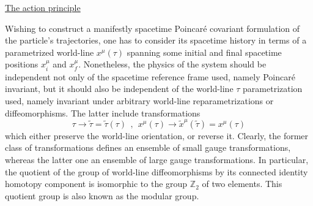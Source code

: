 \documentclass[a4paper,11pt]{article}
\def\Z{\mathbb Z}
\begin{document}
\vspace{10pt}

\noindent\underline{The action principle}

\vspace{5pt}

Wishing to construct a manifestly spacetime Poincar\'e covariant
formulation of the particle's trajectories, one has to consider
its spacetime history in terms of a parametrized world-line $x^\mu(\tau)$
spanning some initial and final spacetime positions $x^\mu_i$ and $x^\mu_f$.
Nonetheless, the physics of the system should be independent not only
of the spacetime reference frame used, namely Poincar\'e invariant,
but it should also be independent of the world-line $\tau$ parametrization
used, namely invariant under arbitrary world-line reparametrizations or
diffeomorphisms. The latter include transformations
\begin{equation}
\tau\rightarrow\tilde{\tau}=\tilde{\tau}(\tau)\ \ ,\ \ 
x^\mu(\tau)\rightarrow\tilde{x}^\mu(\tilde{\tau})=x^\mu(\tau)
\label{eq:wltransf}
\end{equation}
which either preserve the world-line orientation, or reverse it.
Clearly, the former class of transformations defines an ensemble
of small gauge transformations, whereas the latter one an ensemble
of large gauge transformations. In particular, the quotient of
the group of world-line diffeomorphisms by its connected identity
homotopy component is isomorphic to the group $\Z_2$ of two elements.
This quotient group is also known as the modular group.
\end{document}
